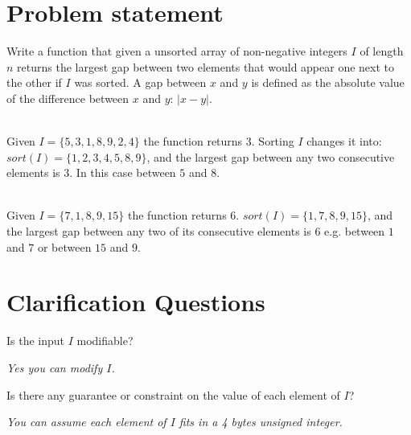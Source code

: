 \section{Problem statement}
\begin{exercise}
\label{example:max_gap:exercice1}
Write a function that given a unsorted array of non-negative integers $I$ of length $n$ returns the
largest gap between two elements that would appear one next to the other  
if $I$ was sorted. A gap between $x$ and $y$ is defined as the absolute value of the difference
between $x$ and $y$: $|x-y|$.

	\begin{example}
		\label{example:max_gap:example1}
		\hfill \\
		Given $I = \{5,3,1,8,9,2,4\}$ the function returns $3$. Sorting $I$ changes it into:
		$sort(I)= \{1,2,3,4,5,8,9\}$, and the largest gap between any two consecutive elements is
		$3$. In this case between $5$ and $8$.		
	\end{example}

	\begin{example}
		\label{example:max_gap:example2}
		\hfill \\
		Given $I = \{7, 1, 8, 9,15\}$ the function returns $6$. $sort(I)= \{1,7,8,9,15\}$, and the
		largest gap between any two of its consecutive elements is $6$ e.g. between $1$ and $7$ or
		between $15$ and $9$.	
	\end{example}
	
\end{exercise}

\section{Clarification Questions}

\begin{QandA}
	\begin{questionitem} \begin{question} Is the input $I$ modifiable?  \end{question} 	 
    \begin{answered}
		\textit{Yes you can modify $I$.}
	\end{answered} \end{questionitem}

	\begin{questionitem} \begin{question} Is there any guarantee or constraint on the value of each element of $I$?  \end{question} 	 
    \begin{answered}
		\textit{You can assume each element of $I$  fits in a 4 bytes unsigned integer.}
	\end{answered} \end{questionitem}
	
\end{QandA}

